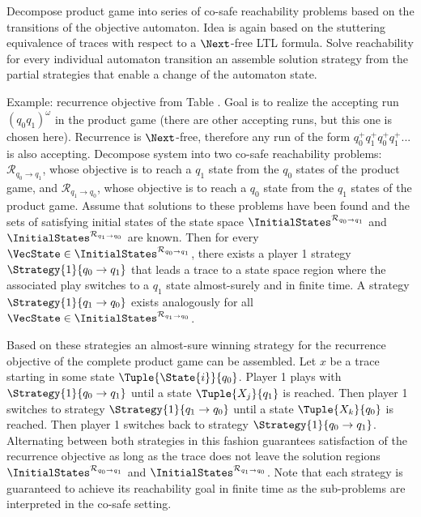 \stopsubsection


\startsubsection[title={Transition-based Reachability Decomposition},reference=sec:refinement-transition-decomposition]

    Decompose product game into series of co-safe reachability problems based on the transitions of the objective automaton.
    Idea is again based on the stuttering equivalence of traces with respect to a $\Next$-free LTL formula.
    Solve reachability for every individual automaton transition an assemble solution strategy from the partial strategies that enable a change of the automaton state.

    Example: recurrence objective from Table .
    Goal is to realize the accepting run $(q_0 q_1)^\omega$ in the product game (there are other accepting runs, but this one is chosen here).
    Recurrence is $\Next$-free, therefore any run of the form $q_0^+ q_1^+ q_0^+ q_1^+ ...$ is also accepting.
    Decompose system into two co-safe reachability problems:
    $\mathcal{R}_{q_0 \rightarrow q_1}$, whose objective is to reach a $q_1$ state from the $q_0$ states of the product game, and $\mathcal{R}_{q_1 \rightarrow q_0}$, whose objective is to reach a $q_0$ state from the $q_1$ states of the product game.
    Assume that solutions to these problems have been found and the sets of satisfying initial states of the state space $\InitialStates^{\mathcal{R}_{q_0 \rightarrow q_1}}$ and $\InitialStates^{\mathcal{R}_{q_1 \rightarrow q_0}}$ are known.
    Then for every $\VecState \in \InitialStates^{\mathcal{R}_{q_0 \rightarrow q_1}}$, there exists a player 1 strategy $\Strategy{1}{q_0 \rightarrow q_1}$ that leads a trace to a state space region where the associated play switches to a $q_1$ state almost-surely and in finite time.
    A strategy $\Strategy{1}{q_1 \rightarrow q_0}$ exists analogously for all $\VecState \in \InitialStates^{\mathcal{R}_{q_1 \rightarrow q_0}}$.

    Based on these strategies an almost-sure winning strategy for the recurrence objective of the complete product game can be assembled.
    Let $x$ be a trace starting in some state $\Tuple{\State{i}}{q_0}$.
    Player 1 plays with $\Strategy{1}{q_0 \rightarrow q_1}$ until a state $\Tuple{X_j}{q_1}$ is reached.
    Then player 1 switches to strategy $\Strategy{1}{q_1 \rightarrow q_0}$ until a state $\Tuple{X_k}{q_0}$ is reached.
    Then player 1 switches back to strategy $\Strategy{1}{q_0 \rightarrow q_1}$.
    Alternating between both strategies in this fashion guarantees satisfaction of the recurrence objective as long as the trace does not leave the solution regions $\InitialStates^{\mathcal{R}_{q_0 \rightarrow q_1}}$ and $\InitialStates^{\mathcal{R}_{q_1 \rightarrow q_0}}$.
    Note that each strategy is guaranteed to achieve its reachability goal in finite time as the sub-problems are interpreted in the co-safe setting.

